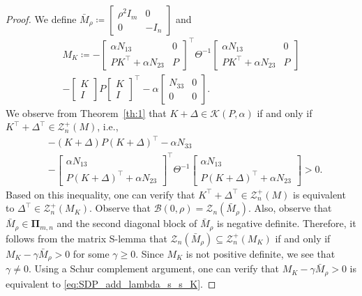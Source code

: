 \documentclass[9pt,shortpaper,twoside,web]{ieeecolor}
\newcommand{\mac}[1]{\mathcal{#1}}
\begin{document}
\begin{proof}
We define $\bar M_\rho \coloneqq \begin{bmatrix}
        \rho^2I_m & 0 \\ 0 & -I_n
    \end{bmatrix}$ and
\begin{equation}
\label{eq:def_MDelta}
\begin{split}
    M_{K}\coloneqq-\begin{bmatrix}
        \alpha N_{13} & 0 \\ PK^\top+\alpha N_{23} & P 
    \end{bmatrix}^\top \Theta^{-1}\begin{bmatrix}
        \alpha N_{13} & 0 \\ PK^\top+\alpha N_{23} & P 
    \end{bmatrix} \\
    -\begin{bmatrix}
        K \\ I
    \end{bmatrix}P\begin{bmatrix}
        K \\ I
    \end{bmatrix}^\top - \alpha \begin{bmatrix}
        N_{33} & 0 \\ 0 & 0
    \end{bmatrix}.
\end{split}
\end{equation}  
We observe from Theorem~\ref{th:1} that $K+\Delta \in \mathcal{K}(P,\alpha)$ if and only if $K^\top+\Delta^\top \in \mac{Z}^+_n(M)$, i.e.,
\begin{equation}
    \label{eq:schurC_KPDelta}
    \begin{split}
        &-(K+\Delta)P(K+\Delta)^\top-\alpha N_{33} \\
        &-\begin{bmatrix}
        \alpha N_{13} \\ P(K+\Delta)^\top+\alpha N_{23}
    \end{bmatrix}^\top \!\!\! \Theta^{-1} \!\! \begin{bmatrix}
        \alpha N_{13} \\ P(K+\Delta)^\top+\alpha N_{23}
    \end{bmatrix} > 0.
    \end{split}
\end{equation}
Based on this inequality, one can verify that \mbox{$K^\top+\Delta^\top \in \mac{Z}^+_n(M)$} is equivalent to $\Delta^\top \in \mac{Z}^+_n(M_K)$. Observe that \mbox{$\mac{B}(0,\rho)=\mac{Z}_n(\bar M_\rho)$}. Also, observe that $\bar M_\rho \in \pmb{\Pi}_{m,n}$ and the second diagonal block of $\bar M_\rho$ is negative definite. Therefore, it follows from the matrix \mbox{S-lemma} \cite[Thm. 4.10]{HenkQMI2023} that $\mathcal{Z}_{n}(\bar M_\rho)\subseteq\mathcal{Z}_{n}^+(M_K)$ if and only if  \mbox{$M_K-\gamma \bar M_\rho> 0$} for some $\gamma\geq 0$. Since $M_K$ is not positive definite, we see that $\gamma\neq0$. Using a Schur complement argument, one can verify that $M_K-\gamma \bar M_\rho>0$ is equivalent to \eqref{eq:SDP_add_lambda_s_s_K}. 
\end{proof}
\end{document}
